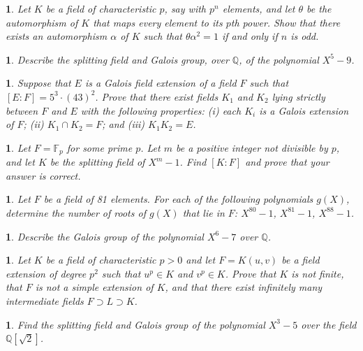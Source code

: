 \documentclass[a4paper,11pt,final,openany]{memoir}
\newtheorem{exercise}[Y]{}
\theoremstyle{nonumberplain}
\begin{document}
\begin{exercise}
\label{x59} Let $K$ be a field of characteristic $p$, say with $p^{n}$
elements, and let $\theta$ be the automorphism of $K$ that maps every element
to its $p$th power. Show that there exists an automorphism $\alpha$ of $K$
such that $\theta\alpha^{2}=1$ if and only if $n$ is odd.
\end{exercise}

\begin{exercise}
\label{x60} Describe the splitting field and Galois group, over ${\mathbb{Q}}%
$, of the polynomial $X^{5}-9$.
\end{exercise}

\begin{exercise}
\label{x61} Suppose that $E$ is a Galois field extension of a field $F$ such
that $[E\colon F]=5^{3}\cdot(43)^{2}$. Prove that there exist fields $K_{1}$
and $K_{2}$ lying strictly between $F$ and $E$ with the following properties:
(i) each $K_{i}$ is a Galois extension of $F$; (ii) $K_{1}\cap K_{2}=F$; and
(iii) $K_{1}K_{2}=E$.
\end{exercise}

\begin{exercise}
\label{x62} Let $F=\mathbb{F}_{p}$ for some prime $p$. Let $m$ be a positive
integer not divisible by $p$, and let $K$ be the splitting field of $X^{m}-1$.
Find $[K\colon F]$ and prove that your answer is correct.
\end{exercise}

\begin{exercise}
\label{x63} Let $F$ be a field of 81 elements. For each of the following
polynomials $g(X)$, determine the number of roots of $g(X)$ that lie in $F$:
$X^{80}-1$, $X^{81}-1$, $X^{88}- 1$.
\end{exercise}

\begin{exercise}
\label{x64} Describe the Galois group of the polynomial $X^{6}-7$ over
${\mathbb{Q}}$.
\end{exercise}

\begin{exercise}
\label{x65} Let $K$ be a field of characteristic $p>0$ and let $F=K(u,v)$ be a
field extension of degree $p^{2}$ such that $u^{p}\in K$ and $v^{p}\in K$.
Prove that $K$ is not finite, that $F$ is not a simple extension of $K$, and
that there exist infinitely many intermediate fields $F\supset L\supset K$.
\end{exercise}

\begin{exercise}
\label{x66} Find the splitting field and Galois group of the polynomial
$X^{3}-5$ over the field ${\mathbb{Q}}[\sqrt2]$.
\end{exercise}
\end{document}
